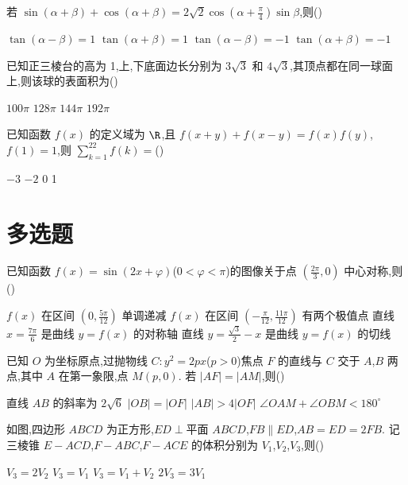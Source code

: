 \begin{problem}
若 \(\sin(\alpha+\beta)+\cos(\alpha+\beta)=2\sqrt2\cos\left(\alpha+\frac{\pi}{4}\right)\sin\beta\),则(\quad)

\choices
    {\(\tan(\alpha-\beta)=1\)}
    {\(\tan(\alpha+\beta)=1\)}
    {\(\tan(\alpha-\beta)=-1\)}
    {\(\tan(\alpha+\beta)=-1\)}
\end{problem}

\begin{problem}
已知正三棱台的高为 1,上,下底面边长分别为 \(3\sqrt3\) 和 \(4\sqrt3\),其顶点都在同一球面上,则该球的表面积为(\quad)

\choices
    {\(100\pi\)}
    {\(128\pi\)}
    {\(144\pi\)}
    {\(192\pi\)}
\end{problem}

\begin{problem}
已知函数 \(f(x)\) 的定义域为 \(\R\),且 \(f(x+y)+f(x-y)=f(x)f(y)\),\(f(1)=1\),则 \(\sum_{k=1}^{22}f(k)=\)(\quad)

\choices
    {\(-3\)}
    {\(-2\)}
    {0}
    {1}
\end{problem}

\section{多选题}

\begin{problem}
已知函数 \(f(x)=\sin(2x+\varphi)\)(\(0<\varphi<\pi\))的图像关于点 \(\left(\frac{2\pi}{3},0\right)\) 中心对称,则(\quad)

\choices
    {\(f(x)\) 在区间 \(\left(0,\frac{5\pi}{12}\right)\) 单调递减}
    {\(f(x)\) 在区间 \(\left(-\frac{\pi}{12},\frac{11\pi}{12}\right)\) 有两个极值点}
    {直线 \(x=\frac{7\pi}{6}\) 是曲线 \(y=f(x)\) 的对称轴}
    {直线 \(y=\frac{\sqrt3}{2}-x\) 是曲线 \(y=f(x)\) 的切线}
\end{problem}

\begin{problem}
已知 \(O\) 为坐标原点,过抛物线 \(C:y^2=2px\)(\(p>0\))焦点 \(F\) 的直线与 \(C\) 交于 \(A\),\(B\) 两点,其中 \(A\) 在第一象限,点 \(M(p,0)\). 若 \(|AF|=|AM|\),则(\quad)

\choices
    {直线 \(AB\) 的斜率为 \(2\sqrt6\)}
    {\(|OB|=|OF|\)}
    {\(|AB|>4|OF|\)}
    {\(\angle OAM+\angle OBM<180^\circ\)}
\end{problem}

\begin{problem}
如图,四边形 \(ABCD\) 为正方形,\(ED\perp\text{平面 }ABCD\),\(FB\parallel ED\),\(AB=ED=2FB\). 记三棱锥 \(E-ACD\),\(F-ABC\),\(F-ACE\) 的体积分别为 \(V_1\),\(V_2\),\(V_3\),则(\quad)


\choices
    {\(V_3=2V_2\)}
    {\(V_3=V_1\)}
    {\(V_3=V_1+V_2\)}
    {\(2V_3=3V_1\)}
\end{problem}

